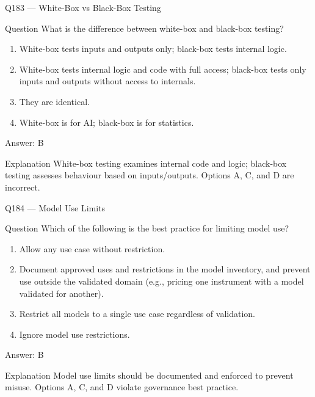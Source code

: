 \documentclass[aspectratio=169,8pt]{beamer}
\begin{document}
\begin{frame}{Q183 --- White-Box vs Black-Box Testing}
\begin{block}{Question}
What is the difference between white-box and black-box testing?
\begin{enumerate}
\item White-box tests inputs and outputs only; black-box tests internal logic.
\item White-box tests internal logic and code with full access; black-box tests only inputs and outputs without access to internals.
\item They are identical.
\item White-box is for AI; black-box is for statistics.
\end{enumerate}  \end{block}
\begin{exampleblock}{Answer: B}\end{exampleblock}
\begin{block}{Explanation}
White-box testing examines internal code and logic; black-box testing assesses behaviour based on inputs/outputs. Options A, C, and D are incorrect.
\end{block}
\end{frame}

\begin{frame}{Q184 --- Model Use Limits}
\begin{block}{Question}
Which of the following is the best practice for limiting model use?
\begin{enumerate}
\item Allow any use case without restriction.
\item Document approved uses and restrictions in the model inventory, and prevent use outside the validated domain (e.g., pricing one instrument with a model validated for another).
\item Restrict all models to a single use case regardless of validation.
\item Ignore model use restrictions.
\end{enumerate}  \end{block}
\begin{exampleblock}{Answer: B}\end{exampleblock}
\begin{block}{Explanation}
Model use limits should be documented and enforced to prevent misuse. Options A, C, and D violate governance best practice.
\end{block}
\end{frame}
\end{document}
